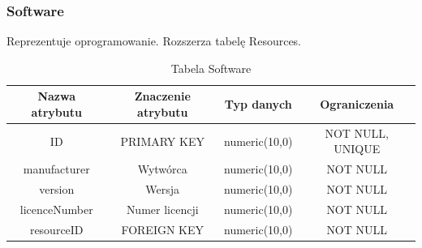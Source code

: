 \subsubsection{Software}
Reprezentuje oprogramowanie. Rozszerza tabelę Resources.
\begin{table}[H]
	\renewcommand\arraystretch{1.5}
	\renewcommand\tabcolsep{3pt}
	\begin{tabular}{| c | c | c | c |} 
		\hline \textbf{Nazwa atrybutu} & \textbf{Znaczenie atrybutu} & \textbf{Typ danych} & \textbf{Ograniczenia} \\ 
		\hline ID & PRIMARY KEY & numeric(10,0) & NOT NULL, UNIQUE \\ 
		\hline manufacturer & Wytwórca & numeric(10,0) & NOT NULL \\ 
		\hline version & Wersja & numeric(10,0) & NOT NULL \\ 
		\hline licenceNumber & Numer licencji & numeric(10,0) & NOT NULL \\ 
		\hline resourceID & FOREIGN KEY & numeric(10,0) & NOT NULL \\ 
		\hline 
	\end{tabular} 
	\caption{Tabela Software}
	\label{TAB:Software}
\end{table}